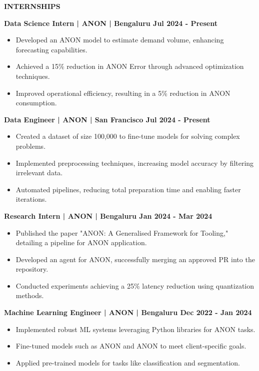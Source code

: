 \documentclass[10pt,a4paper]{article}
\newcommand{\customsection}[1]{%
    \vspace{0.3em}
    \noindent\colorbox{sectionblue}{\parbox{\dimexpr\textwidth-2\fboxsep}{
        \vspace{0.1em}\centering\textbf{\fontsize{10}{12}\selectfont #1}\vspace{0.1em}
    }}
    \vspace{0.3em}
}
\begin{document}
\customsection{INTERNSHIPS}
{\small
\noindent\textbf{Data Science Intern | ANON | Bengaluru \hfill Jul 2024 - Present}
\begin{itemize}
\item Developed an ANON model to estimate demand volume, enhancing forecasting capabilities.
\item Achieved a 15\% reduction in ANON Error through advanced optimization techniques.
\item Improved operational efficiency, resulting in a 5\% reduction in ANON consumption.
\end{itemize}

\noindent\textbf{Data Engineer | ANON | San Francisco \hfill Jul 2024 - Present}
\begin{itemize}
\item Created a dataset of size 100,000 to fine-tune models for solving complex problems.
\item Implemented preprocessing techniques, increasing model accuracy by filtering irrelevant data.
\item Automated pipelines, reducing total preparation time and enabling faster iterations.
\end{itemize}

\noindent\textbf{Research Intern | ANON | Bengaluru \hfill Jan 2024 - Mar 2024}
\begin{itemize}
\item Published the paper "ANON: A Generalised Framework for Tooling," detailing a pipeline for ANON application.
\item Developed an agent for ANON, successfully merging an approved PR into the repository.
\item Conducted experiments achieving a 25\% latency reduction using quantization methods.
\end{itemize}

\noindent\textbf{Machine Learning Engineer | ANON | Bengaluru \hfill Dec 2022 - Jan 2024}
\begin{itemize}
\item Implemented robust ML systems leveraging Python libraries for ANON tasks.
\item Fine-tuned models such as ANON and ANON to meet client-specific goals.
\item Applied pre-trained models for tasks like classification and segmentation.
\end{itemize}
}
\end{document}
